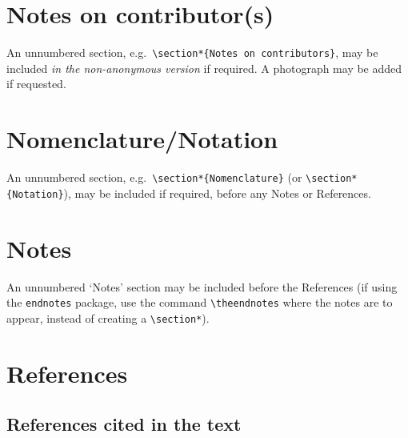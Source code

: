 \documentclass[]{interact}
\theoremstyle{plain}%
\theoremstyle{definition}
\theoremstyle{remark}
\begin{document}
\section*{Notes on contributor(s)}

An unnumbered section, e.g.\ \verb"\section*{Notes on contributors}", may be included \emph{in the non-anonymous version} if required. A photograph may be added if requested.


\section*{Nomenclature/Notation}

An unnumbered section, e.g.\ \verb"\section*{Nomenclature}" (or \verb"\section*{Notation}"), may be included if required, before any Notes or References.


\section*{Notes}

An unnumbered `Notes' section may be included before the References (if using the \verb"endnotes" package, use the command \verb"\theendnotes" where the notes are to appear, instead of creating a \verb"\section*").


\section{References}

\subsection{References cited in the text}
\end{document}
